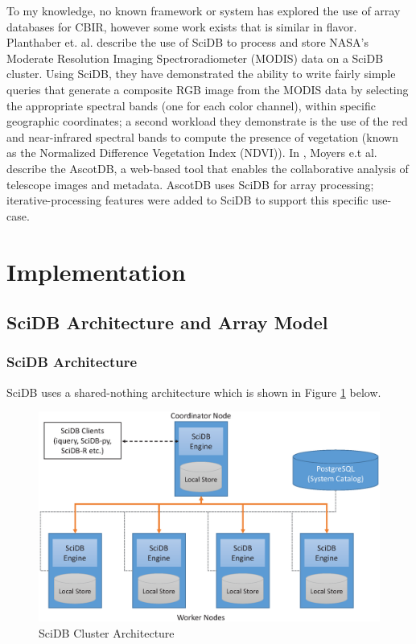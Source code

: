 \documentclass[letterpaper,twocolumn,10pt]{article}
\begin{document}
To my knowledge, no known framework or system has explored the use of array databases for CBIR, however some work exists that is similar in flavor. Planthaber et. al. \cite{planthaber2012earthdb} describe the use of SciDB to process and store NASA's  Moderate Resolution Imaging Spectroradiometer (MODIS) data on a SciDB cluster. Using SciDB, they have demonstrated the ability to write fairly simple queries that generate a composite RGB image from the MODIS data by selecting the appropriate spectral bands (one for each color channel), within specific geographic coordinates; a second workload they demonstrate is the use of the red and near-infrared spectral bands to compute the presence of vegetation (known as the Normalized Difference Vegetation Index (NDVI)). In \cite{Moyers:2013:DIP:2536274.2536306}, Moyers e.t al. describe the AscotDB, a web-based tool that enables the collaborative analysis of telescope images and metadata. AscotDB uses SciDB for array processing; iterative-processing features were added to SciDB to support this specific use-case.

\section{Implementation}\label{sec:implementation}

\subsection{SciDB Architecture and Array Model}\label{sec:arch}

\subsubsection{SciDB Architecture}
SciDB uses a shared-nothing architecture which is shown in Figure \ref{fig:arch} below.

\begin{figure}[ht]
\centering
\includegraphics[width=.6\textwidth]{figures/scidb_architecture.eps}
\caption{SciDB Cluster Architecture}
\label{fig:arch}
\end{figure}
\end{document}
